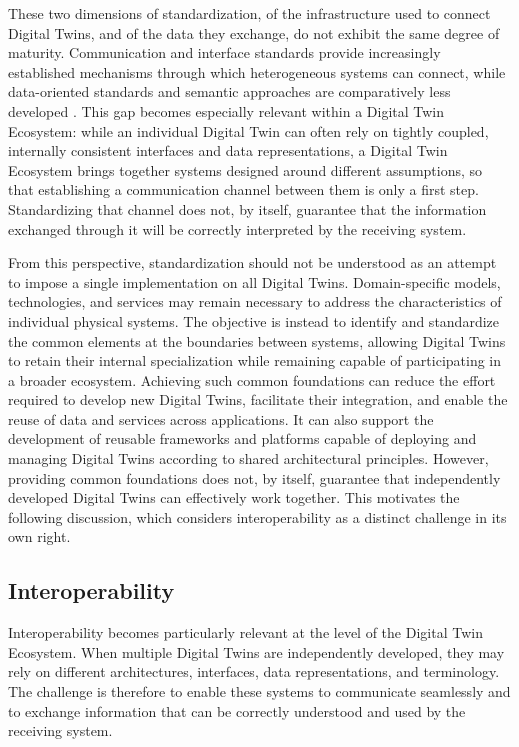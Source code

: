 These two dimensions of standardization, of the infrastructure used to connect Digital Twins, and of the data they exchange, do not exhibit the same degree of maturity. Communication and interface standards provide increasingly established mechanisms through which heterogeneous systems can connect, while data-oriented standards and semantic approaches are comparatively less developed \cite{wang2022standards}. This gap becomes especially relevant within a Digital Twin Ecosystem: while an individual Digital Twin can often rely on tightly coupled, internally consistent interfaces and data representations, a Digital Twin Ecosystem brings together systems designed around different assumptions, so that establishing a communication channel between them is only a first step. Standardizing that channel does not, by itself, guarantee that the information exchanged through it will be correctly interpreted by the receiving system.

From this perspective, standardization should not be understood as an attempt to impose a single implementation on all Digital Twins. Domain-specific models, technologies, and services may remain necessary to address the characteristics of individual physical systems. The objective is instead to identify and standardize the common elements at the boundaries between systems, allowing Digital Twins to retain their internal specialization while remaining capable of participating in a broader ecosystem. Achieving such common foundations can reduce the effort required to develop new Digital Twins, facilitate their integration, and enable the reuse of data and services across applications. It can also support the development of reusable frameworks and platforms capable of deploying and managing Digital Twins according to shared architectural principles.     However, providing common foundations does not, by itself, guarantee that independently developed Digital Twins can effectively work together. This motivates the following discussion, which considers interoperability as a distinct challenge in its own right.

\subsection{Interoperability}

Interoperability becomes particularly relevant at the level of the Digital Twin Ecosystem. When multiple Digital Twins are independently developed, they may rely on different architectures, interfaces, data representations, and terminology. The challenge is therefore to enable these systems to communicate seamlessly and to exchange information that can be correctly understood and used by the receiving system.

